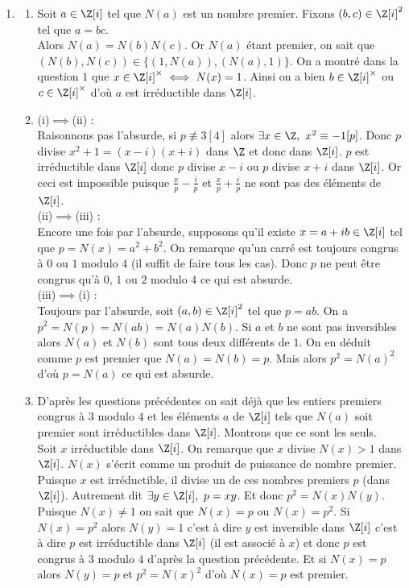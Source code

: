 \documentclass[8pt]{book}
\begin{document}
\begin{enumerate}
		On montre alors (cf. \ref{Anneau euclidien}) qu'il est principal.
		\item \begin{enumerate}[label=\alph*.]
			\item Soit $a\in \Z[i]$ tel que $N(a)$ est un nombre premier. Fixons $(b,c)\in \Z[i]^2$ tel que $a=bc$.\\
			Alors $N(a)=N(b)N(c)$. Or $N(a)$ étant premier, on sait que $(N(b),N(c))\in\{(1,N(a)),(N(a),1)\}$. On a montré dans la question $1$ que $x\in \Z[i]^\times\iff N(x)=1$. Ainsi on a bien $b\in \Z[i]^\times$ ou $c\in \Z[i]^\times$ d'où $a$ est irréductible dans $\Z[i]$.
			\item (i)$\implies$(ii) :\\
			Raisonnons pas l'absurde, si $p\not \equiv 3[4]$ alors $\exists x\in \Z,\ x^2\equiv -1[p]$. Donc $p$ divise $x^2+1=(x-i)(x+i)$ dans $\Z$ et donc dans $\Z[i]$. $p$ est irréductible dans $\Z[i]$ donc $p$ divise $x-i$ ou $p$ divise $x+i$ dans $\Z[i]$. Or ceci est impossible puisque $\displaystyle\frac{x}{p}-\frac{i}{p}$ et $\displaystyle\frac{x}{p}+\frac{i}{p}$ ne sont pas des éléments de $\Z[i]$.\\
			(ii)$\implies$(iii) :\\
			Encore une fois par l'absurde, supposons qu'il existe $x=a+ib\in \Z[i]$ tel que $p=N(x)=a^2+b^2$. On remarque qu'un carré est toujours congrus à $0$ ou $1$ modulo $4$ (il suffit de faire tous les cas). Donc $p$ ne peut être congrus qu'à $0$, $1$ ou $2$ modulo $4$ ce qui est absurde.\\
			(iii)$\implies$(i) :\\
			Toujours par l'absurde, soit $(a,b)\in \Z[i]^2$ tel que $p=ab$. On a $p^2=N(p)=N(ab)=N(a)N(b)$. Si $a$ et $b$ ne sont pas inversibles alors $N(a)$ et $N(b)$ sont tous deux différents de $1$. On en déduit comme $p$ est premier que $N(a)=N(b)=p$. Mais alors $p^2=N(a)^2$ d'où $p=N(a)$ ce qui est absurde.
			\item D'après les questions précédentes on sait déjà que les entiers premiers congrus à $3$ modulo $4$ et les éléments $a$ de $\Z[i]$ tels que $N(a)$ soit premier sont irréductibles dans $\Z[i]$. Montrons que ce sont les seuls.\\
			Soit $x$ irréductible dans $\Z[i]$. On remarque que $x$ divise $N(x)>1$ dans $\Z[i]$. $N(x)$ s'écrit comme un produit de puissance de nombre premier. Puisque $x$ est irréductible, il divise un de ces nombres premiers $p$ (dans $\Z[i]$). Autrement dit $\exists y\in \Z[i],\ p=xy$. Et donc $p^2=N(x)N(y)$. Puisque $N(x)\ne 1$ on sait que $N(x)=p$ ou $N(x)=p^2$. Si $N(x)=p^2$ alors $N(y)=1$ c'est à dire $y$ est inversible dans $\Z[i]$ c'est à dire $p$ est irréductible dans $\Z[i]$ (il est associé à $x$) et donc $p$ est congrus à $3$ modulo $4$ d'après la question précédente. Et si $N(x)=p$ alors $N(y)=p$ et $p^2=N(x)^2$ d'où $N(x)=p$ est premier.

\end{enumerate}
\end{enumerate}
\end{document}
